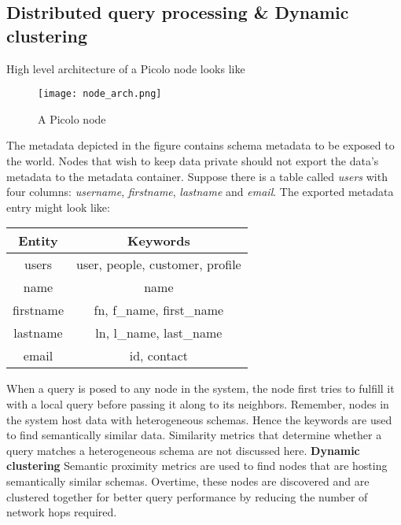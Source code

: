 \subsection{Distributed query processing \& Dynamic clustering} \label{sec:dynamic_cluster}
High level architecture of a Picolo node looks like 
\begin{figure}[h!] \centering
	\texttt{[image: node\_arch.png]}
	\caption{A Picolo node}
	\label{fig:node_arch}
\end{figure}
The metadata depicted in the figure contains schema metadata to be exposed to the world. Nodes that wish to keep data private should not export the data's metadata to the metadata container. Suppose there is a table called \textit{users} with four columns: \textit{username}, \textit{firstname}, \textit{lastname} and \textit{email}. The exported metadata entry might look like:
\begin{center}
	\begin{tabular}{| c | c |} 
		\hline
		Entity & Keywords \\ [0.5ex] 
		\hline
		users & user, people, customer, profile\\ 
		\hline
		name & name \\
		\hline
		firstname & fn, {f\_name}, {first\_name} \\
		\hline
		lastname & ln, {l\_name}, {last\_name} \\
		\hline
		email & id, contact \\ [1ex] 
		\hline
	\end{tabular}
\end{center}
When a query is posed to any node in the system, the node first tries to fulfill it with a local query before passing it along to its neighbors. Remember, nodes in the system host data with heterogeneous schemas. Hence the keywords are used to find semantically similar data. Similarity metrics that determine whether a query matches a heterogeneous schema are not discussed here.
\newline\newline
\textbf{Dynamic clustering}
Semantic proximity metrics are used to find nodes that are hosting semantically similar schemas. Overtime, these nodes are discovered and are clustered together for better query performance by reducing the number of network hops required.

